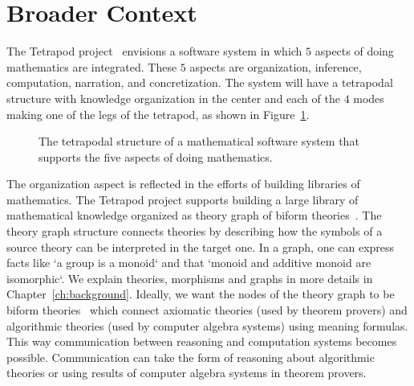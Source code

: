 \section{Broader Context}
\label{sec:broader_context}
The Tetrapod project~\cite{carette2020bigMath} envisions a software system in which $5$ aspects of doing mathematics are integrated. These $5$ aspects are organization, inference, computation, narration, and concretization. The system will have a tetrapodal structure with knowledge organization in the center and each of the $4$ modes making one of the legs of the tetrapod, as shown in Figure~\ref{fig:tetrapod}. 
\begin{figure}[h]
\caption{The tetrapodal structure of a mathematical software system that supports the five aspects of doing mathematics. }
\label{fig:tetrapod}
\end{figure}

The organization aspect is reflected in the efforts of building libraries of mathematics. The Tetrapod project supports building a large library of mathematical knowledge organized as theory graph of biform theories~\cite{biformCICM2018}. The theory graph structure connects theories by describing how the symbols of a source theory can be interpreted in the target one. In a graph, one can express facts like `a group is a monoid` and that `monoid and additive monoid are isomorphic`. We explain theories, morphisms and graphs in more details in Chapter~\ref{ch:background}. 
Ideally, we want the nodes of the theory graph to be biform theories~\cite{biformCICM2018} which connect axiomatic theories  (used by theorem provers) and algorithmic theories (used by computer algebra systems) using meaning formulas. This way communication between reasoning and computation systems becomes possible. Communication can take the form of reasoning about algorithmic theories or using results of computer algebra systems in theorem provers.

